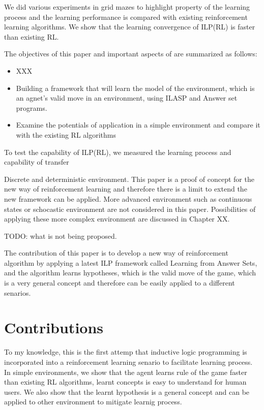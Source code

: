 We did various experiments in grid mazes to highlight property of the learning process and the learning performance is compared with existing reinforcement learning algorithms.
We show that the learning convergence of ILP(RL) is faster than existing RL. 

The objectives of this paper and important aspects of are summarized as follows:


\begin{itemize}
    \item XXX
    \item Building a framework that will learn the model of the environment, which is an agnet's valid move in an environment, using ILASP and Answer set programs. 
    \item Examine the potentials of application in a simple environment and compare it with the existing RL algorithms 
\end{itemize}

To test the capability of ILP(RL), we measured the learning process and capability of transfer

Discrete and deterministic environment. 
This paper is a proof of concept for the new way of reinforcement learning and therefore there is a limit to extend the new framework can be applied.
More advanced environment such as continuous states or schocastic environment are not considered in this paper. Possibilities of applying these more complex environment are discussed in Chapter XX.

TODO: what is not being proposed.

The contribution of this paper is to develop a new way of reinforcement algorithm by applying a latest ILP framework called Learning from Answer Sets, 
and the algorithm learns hypotheses, which is the valid move of the game, which is a very general concept and therefore can be easily applied to a different senarios.

\section{Contributions}
\label{contributions}

To my knowledge, this is the first attemp that inductive logic programming is incorporated into a reinforcement learning senario to facilitate learning process.
In simple environments, we show that the agent learns rule of the game faster than existing RL algorithms, learnt concepts is easy to understand for human users.
We also show that the learnt hypothesis is a general concept and can be applied to other environment to mitigate learnig process.

